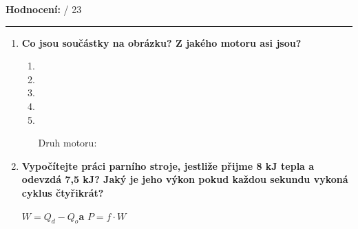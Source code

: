 \documentclass[../main.tex]{subfiles}
\begin{document}
    \tecky{3cm}
    \hspace{0.25cm}
    \textbf{Hodnocení:}
    \tecky{0.5cm}
    {/}
    {23}
    \vspace{0.25cm}
    \hrule
\begin{enumerate}[label={\textbf{\arabic*.}}, resume]

    \item \textbf{Co jsou součástky na obrázku? Z jakého motoru asi jsou?}
        \begin{enumerate}[label={\arabic*.}, wide=0pt]
        \item {}\tecky{5.3cm}
        \item {}\tecky{5.3cm}
        \item {}\tecky{5.3cm}
        \item {}\tecky{5.3cm}
        \item {}\tecky{5.3cm}
        \item[Druh motoru:]\tecky{3cm}
    \end{enumerate}

    \item \textbf{Vypočítejte práci parního stroje, jestliže přijme 8 kJ tepla a odevzdá 7,5 kJ? Jaký je jeho výkon pokud každou sekundu vykoná cyklus čtyřikrát?}
    \vspace{-0.75cm}
    
    \begin{flushright}
        \begin{minipage}{0.32\textwidth}
            \begin{tcolorbox}[colframe=black, colback=white, boxrule=0.6pt]
                {\(W=Q_d-Q_o\)\hspace{0.25cm}\textbf{a}\hspace{0.25cm}  \(P=f\cdot{W}\)}
            \end{tcolorbox}
        \end{minipage}
    \end{flushright}


\end{enumerate}
\end{document}

